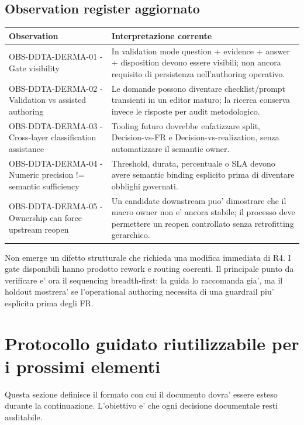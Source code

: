 \documentclass[11pt,a4paper]{article}
\begin{document}
\subsection{Observation register aggiornato}
\begin{longtable}{L{45mm}L{112mm}}
\toprule
\textbf{Observation} & \textbf{Interpretazione corrente} \\
\midrule
\endhead
OBS-DDTA-DERMA-01 - Gate visibility & In validation mode question + evidence + answer + disposition devono essere visibili; non ancora requisito di persistenza nell'authoring operativo. \\
OBS-DDTA-DERMA-02 - Validation vs assisted authoring & Le domande possono diventare checklist/prompt transienti in un editor maturo; la ricerca conserva invece le risposte per audit metodologico. \\
OBS-DDTA-DERMA-03 - Cross-layer classification assistance & Tooling futuro dovrebbe enfatizzare split, Decision-vs-FR e Decision-vs-realization, senza automatizzare il semantic owner. \\
OBS-DDTA-DERMA-04 - Numeric precision != semantic sufficiency & Threshold, durata, percentuale o SLA devono avere semantic binding esplicito prima di diventare obblighi governati. \\
OBS-DDTA-DERMA-05 - Ownership can force upstream reopen & Un candidate downstream puo' dimostrare che il macro owner non e' ancora stabile; il processo deve permettere un reopen controllato senza retrofitting gerarchico. \\
\bottomrule
\end{longtable}

\begin{ddtacore}[title={Valutazione provvisoria della metodologia dopo D2 MR-01}]
Non emerge un difetto strutturale che richieda una modifica immediata di R4. I gate disponibili hanno prodotto rework e routing coerenti. Il principale punto da verificare e' ora il sequencing breadth-first: la guida lo raccomanda gia', ma il holdout mostrera' se l'operational authoring necessita di una guardrail piu' esplicita prima degli FR.
\end{ddtacore}


\section{Protocollo guidato riutilizzabile per i prossimi elementi}

Questa sezione definisce il formato con cui il documento dovra' essere esteso durante la continuazione. L'obiettivo e' che ogni decisione documentale resti auditabile.
\end{document}
